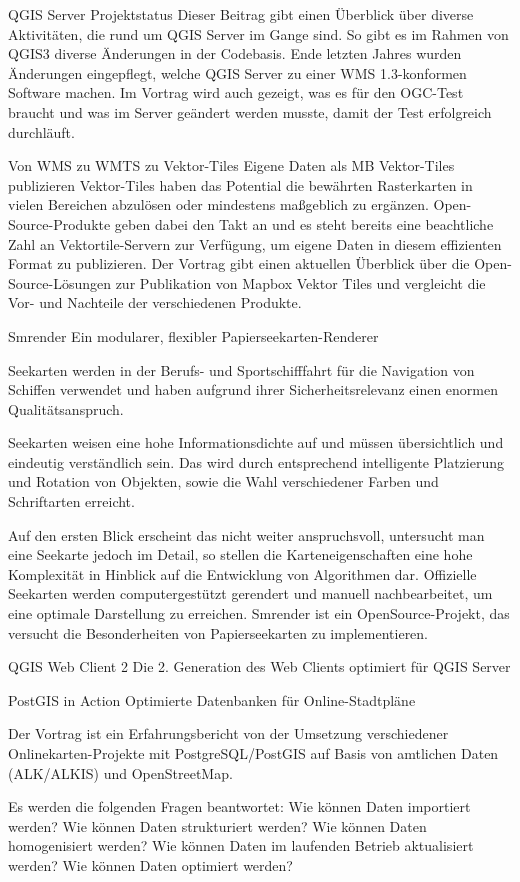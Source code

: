 %
{QGIS Server Projektstatus}%
{}%
{Dieser Beitrag gibt einen Überblick über diverse Aktivitäten, die rund um QGIS Server im Gange sind. So gibt es im Rahmen von QGIS3 diverse Änderungen in der Codebasis. Ende letzten Jahres wurden Änderungen eingepflegt, welche QGIS Server zu einer WMS 1.3-konformen Software machen. Im Vortrag wird auch gezeigt, was es für den OGC-Test braucht und was im Server geändert werden musste, damit der Test erfolgreich durchläuft.}

%
{Von WMS zu WMTS zu Vektor-Tiles}%
{Eigene Daten als MB Vektor-Tiles publizieren}%
{Vektor-Tiles haben das Potential die bewährten
Rasterkarten in vielen Bereichen abzulösen oder mindestens maßgeblich zu ergänzen.
Open-Source-Produkte geben dabei den Takt an und es steht bereits eine beachtliche Zahl an
Vektortile-Servern zur Verfügung, um eigene Daten in diesem effizienten Format zu publizieren. Der
Vortrag gibt einen aktuellen Überblick über die Open-Source-Lösungen zur Publikation von Mapbox
Vektor Tiles und vergleicht die Vor- und Nachteile der verschiedenen Produkte. }

%
{Smrender}%
{Ein modularer, flexibler Papierseekarten-Renderer}%
{Seekarten werden in der Berufs- und Sportschifffahrt für die Navigation von
Schiffen verwendet und haben aufgrund ihrer Sicherheitsrelevanz einen enormen
Qualitätsanspruch.

Seekarten weisen eine hohe Informationsdichte auf und müssen übersichtlich und
eindeutig verständlich sein. Das wird durch entsprechend intelligente
Platzierung und Rotation von Objekten, sowie die Wahl verschiedener Farben und
Schriftarten erreicht.

Auf den ersten Blick erscheint das nicht weiter anspruchsvoll, untersucht man
eine Seekarte jedoch im Detail, so stellen die Karteneigenschaften eine hohe
Komplexität in Hinblick auf die Entwicklung von Algorithmen dar.
Offizielle Seekarten werden computergestützt gerendert und manuell
nachbearbeitet, um eine optimale Darstellung zu erreichen. Smrender ist ein OpenSource-Projekt, das versucht die Besonderheiten von
Papierseekarten zu implementieren.}

%
{QGIS Web Client 2}%
{Die 2. Generation des Web Clients optimiert für QGIS Server}%
{}

%
{PostGIS in Action}%
{Optimierte Datenbanken für Online-Stadtpläne}%
{Der Vortrag ist ein Erfahrungsbericht von der Umsetzung verschiedener Onlinekarten-Projekte mit
  PostgreSQL/PostGIS auf Basis von amtlichen Daten (ALK/ALKIS) und OpenStreetMap. 

Es werden die folgenden Fragen beantwortet: Wie können Daten importiert werden? Wie können Daten
strukturiert werden? Wie können Daten homogenisiert werden? Wie können Daten im laufenden Betrieb
aktualisiert werden? Wie können Daten optimiert werden?}

